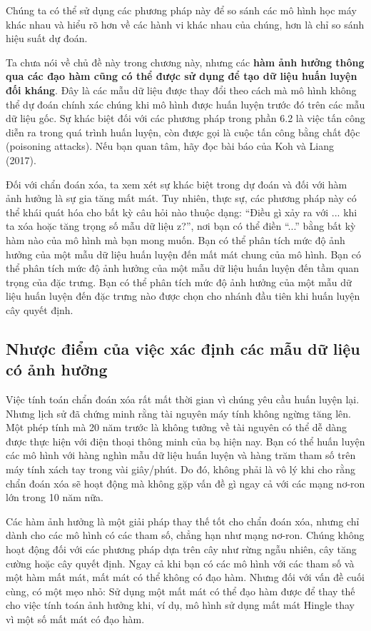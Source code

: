 Chúng ta có thể sử dụng các phương pháp này để so sánh các mô hình học máy khác nhau và hiểu rõ hơn về các hành vi khác nhau của chúng, hơn là chỉ so sánh hiệu suất dự đoán. 

Ta chưa nói về chủ đề này trong chương này, nhưng các \textbf{hàm ảnh hưởng thông qua các đạo hàm cũng có thể được sử dụng để tạo dữ liệu huấn luyện đối kháng}. Đây là các mẫu dữ liệu được thay đổi theo cách mà mô hình không thể dự đoán chính xác chúng khi mô hình được huấn luyện trước đó trên các mẫu dữ liệu gốc. Sự khác biệt đối với các phương pháp trong phần 6.2 là việc tấn công diễn ra trong quá trình huấn luyện, còn được gọi là cuộc tấn công bằng chất độc (poisoning attacks). Nếu bạn quan tâm, hãy đọc bài báo của Koh và Liang (2017).

Đối với chẩn đoán xóa, ta xem xét sự khác biệt trong dự đoán và đối với hàm ảnh hưởng là sự gia tăng mất mát. Tuy nhiên, thực sự, các phương pháp này có thể khái quát hóa cho bất kỳ câu hỏi nào thuộc dạng: ``Điều gì xảy ra với ... khi ta xóa hoặc tăng trọng số mẫu dữ liệu z?'', nơi bạn có thể điền ``...'' bằng bất kỳ hàm nào của mô hình mà bạn mong muốn. Bạn có thể phân tích mức độ ảnh hưởng của một mẫu dữ liệu huấn luyện đến mất mát chung của mô hình. Bạn có thể phân tích mức độ ảnh hưởng của một mẫu dữ liệu huấn luyện đến tầm quan trọng của đặc trưng. Bạn có thể phân tích mức độ ảnh hưởng của một mẫu dữ liệu huấn luyện đến đặc trưng nào được chọn cho nhánh đầu tiên khi huấn luyện cây quyết định. 

\subsection{Nhược điểm của việc xác định các mẫu dữ liệu có ảnh hưởng}

Việc tính toán chẩn đoán xóa rất mất thời gian vì chúng yêu cầu huấn luyện lại. Nhưng lịch sử đã chứng minh rằng tài nguyên máy tính không ngừng tăng lên. Một phép tính mà 20 năm trước là không tưởng về tài nguyên có thể dễ dàng được thực hiện với điện thoại thông minh của bạ hiện nay. Bạn có thể huấn luyện các mô hình với hàng nghìn mẫu dữ liệu huấn luyện và hàng trăm tham số trên máy tính xách tay trong vài giây/phút. Do đó, không phải là vô lý khi cho rằng chẩn đoán xóa sẽ hoạt động mà không gặp vấn đề gì ngay cả với các mạng nơ-ron lớn trong 10 năm nữa.

Các hàm ảnh hưởng là một giải pháp thay thế tốt cho chẩn đoán xóa, nhưng chỉ dành cho các mô hình có các tham số, chẳng hạn như mạng nơ-ron. Chúng không hoạt động đối với các phương pháp dựa trên cây như rừng ngẫu nhiên, cây tăng cường hoặc cây quyết định. Ngay cả khi bạn có các mô hình với các tham số và một hàm mất mát, mất mát có thể không có đạo hàm. Nhưng đối với vấn đề cuối cùng, có một mẹo nhỏ: Sử dụng một mất mát có thể đạo hàm được để thay thế cho việc tính toán ảnh hưởng khi, ví dụ, mô hình sử dụng mất mát Hingle thay vì một số mất mát có đạo hàm.

